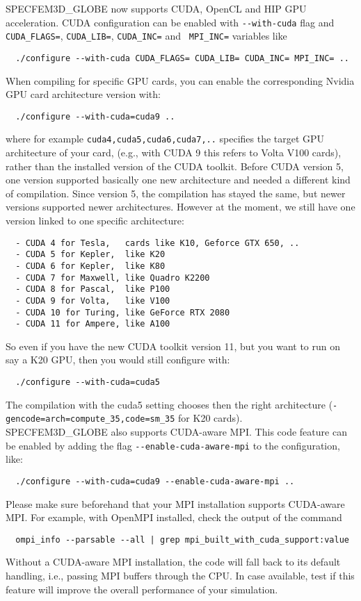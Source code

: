 \noindent
SPECFEM3D\_GLOBE now supports CUDA, OpenCL and HIP GPU acceleration.
CUDA configuration can be enabled with \texttt{-{}-with-cuda} flag and
\texttt{CUDA\_FLAGS=}, \texttt{CUDA\_LIB=}, \texttt{CUDA\_INC=}
and \texttt{ MPI\_INC=} variables like
{\small
\begin{verbatim}
  ./configure --with-cuda CUDA_FLAGS= CUDA_LIB= CUDA_INC= MPI_INC= ..
\end{verbatim}
}
\noindent
When compiling for specific GPU cards, you can enable the corresponding Nvidia GPU card architecture version with:
{\small
\begin{verbatim}
  ./configure --with-cuda=cuda9 ..
\end{verbatim}
}
\noindent
where for example \texttt{cuda4,cuda5,cuda6,cuda7,..} specifies the target GPU architecture of your card,
(e.g., with CUDA 9 this refers to Volta V100 cards), rather than the installed version of the CUDA toolkit.
Before CUDA version 5, one version supported basically one new architecture and needed a different kind of compilation.
Since version 5, the compilation has stayed the same, but newer versions supported newer architectures.
However at the moment, we still have one version linked to one specific architecture:
{\small
\begin{verbatim}
  - CUDA 4 for Tesla,   cards like K10, Geforce GTX 650, ..
  - CUDA 5 for Kepler,  like K20
  - CUDA 6 for Kepler,  like K80
  - CUDA 7 for Maxwell, like Quadro K2200
  - CUDA 8 for Pascal,  like P100
  - CUDA 9 for Volta,   like V100
  - CUDA 10 for Turing, like GeForce RTX 2080
  - CUDA 11 for Ampere, like A100
\end{verbatim}
}
\noindent
So even if you have the new CUDA toolkit version 11, but you want to run on say a K20 GPU, then you would still configure with:
{\small
\begin{verbatim}
  ./configure --with-cuda=cuda5
\end{verbatim}
}
\noindent
The compilation with the cuda5 setting chooses then the right architecture (\texttt{-gencode=arch=compute\_35,code=sm\_35} for K20 cards).\\

SPECFEM3D\_GLOBE also supports CUDA-aware MPI. This code feature can be enabled by adding the flag \texttt{-{}-enable-cuda-aware-mpi} to
the configuration, like:
{\small
\begin{verbatim}
  ./configure --with-cuda=cuda9 --enable-cuda-aware-mpi ..
\end{verbatim}
}
\noindent
Please make sure beforehand that your MPI installation supports CUDA-aware MPI.
For example, with OpenMPI installed, check the output of the command
{\small
\begin{verbatim}
  ompi_info --parsable --all | grep mpi_built_with_cuda_support:value
\end{verbatim}
}
\noindent
Without a CUDA-aware MPI installation, the code will fall back to its default handling, i.e., passing MPI buffers through the CPU.
In case available, test if this feature will improve the overall performance of your simulation.\\

